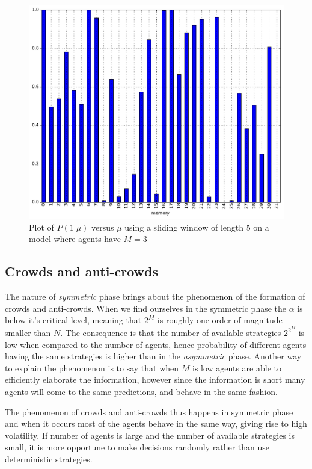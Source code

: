 \begin{figure}[h]
\begin{center}
\includegraphics[scale=0.4]{images/minority/information_probability_m3_a5.pdf}
\caption{Plot of $P(1|\mu)$ versus $\mu$ using a sliding window of length $5$ on a model where agents have $M=3$}
\label{fig:information_35}
\end{center}
\end{figure}

\subsection{Crowds and anti-crowds}
\label{subsec:crowds}

The nature of \textit{symmetric} phase brings about the phenomenon of the formation of crowds and anti-crowds.
When we find ourselves in the symmetric phase the $\alpha$ is below it's critical level, meaning that $2^M$ is roughly one order of magnitude smaller than $N$.
The consequence is that the number of available strategies $2^{2^M}$ is low when compared to the number of agents, hence probability of different agents having the same strategies is higher than in the \textit{asymmetric} phase.
Another way to explain the phenomenon is to say that when $M$ is low agents are able to efficiently elaborate the information, however since the information is short many agents will come to the same predictions, and behave in the same fashion.

The phenomenon of crowds and anti-crowds thus happens in symmetric phase and when it occurs most of the agents behave in the same way, giving rise to high volatility.
If number of agents is large and the number of available strategies is small, it is more opportune to make decisions randomly rather than use deterministic strategies.

